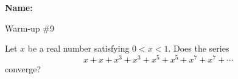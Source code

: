 \documentclass[12pt]{article}
\begin{document}
\noindent \textbf{Name:} 

\begin{center}
Warm-up \#9
\end{center}

\noindent Let $x$ be a real number satisfying $0 < x < 1$. Does the series 
\[
x + x + x^3 + x^3 + x^5 + x^5 + x^7 + x^7 + \cdots
\]
converge?
\end{document}
